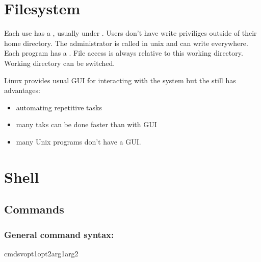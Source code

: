 \documentclass[a4paper,10pt,english]{jupyterBook}
\begin{document}
\sphinxstepscope


\section{Filesystem}
\label{\detokenize{text/progtut/filesystem:filesystem}}\label{\detokenize{text/progtut/filesystem::doc}}
\sphinxAtStartPar
Each use has a , usually under .
Users don’t have write priviliges outside of their home directory.
The administrator is called  in unix and can write everywhere.
Each program has a . File access is always relative to this working directory. Working directory can be switched.

\sphinxAtStartPar
Linux provides usual GUI for interacting with the system but the  still has advantages:
\begin{itemize}
\item {} 
\sphinxAtStartPar
automating repetitive tasks

\item {} 
\sphinxAtStartPar
many taks can be done faster than with GUI

\item {} 
\sphinxAtStartPar
many Unix programs don’t have a GUI.

\end{itemize}

\sphinxstepscope


\section{Shell}
\label{\detokenize{text/progtut/shell:shell}}\label{\detokenize{text/progtut/shell::doc}}

\subsection{Commands}
\label{\detokenize{text/progtut/shell:commands}}

\subsubsection{General command syntax:}
\label{\detokenize{text/progtut/shell:general-command-syntax}}
\begin{sphinxVerbatim}[commandchars=\\\{\}]
\PYGZdl{}cmd\PYGZhy{}sv\PYGZhy{}\PYGZhy{}opt1\PYGZhy{}\PYGZhy{}opt2arg1arg2
\end{sphinxVerbatim}
\end{document}
